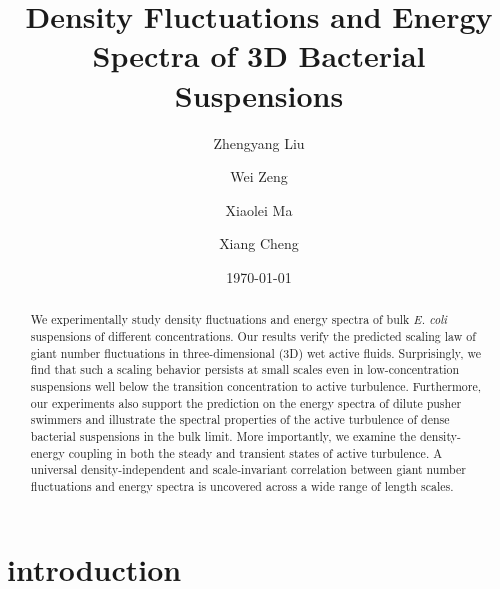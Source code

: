 \documentclass[twocolumn,aps,prx,amsmath,amssymb,longbibliography,superscriptaddress]{revtex4-2}
\begin{document}
\title{Density Fluctuations and Energy Spectra of 3D Bacterial Suspensions}




\author{Zhengyang Liu}
\author{Wei Zeng}
\author{Xiaolei Ma}
\author{Xiang Cheng}




\date{\today}


\begin{abstract}
We experimentally study density fluctuations and energy spectra of bulk \textit{E. coli} suspensions of different concentrations. Our results verify the predicted scaling law of giant number fluctuations in three-dimensional (3D) wet active fluids. Surprisingly, we find that such a scaling behavior persists at small scales even in low-concentration suspensions well below the transition concentration to active turbulence. Furthermore, our experiments also support the prediction on the energy spectra of dilute pusher swimmers and illustrate the spectral properties of the active turbulence of dense bacterial suspensions in the bulk limit. More importantly, we examine the density-energy coupling in both the steady and transient states of active turbulence. A universal density-independent and scale-invariant correlation between giant number fluctuations and energy spectra is uncovered across a wide range of length scales.

\end{abstract}

\maketitle

\section{introduction}
\end{document}
